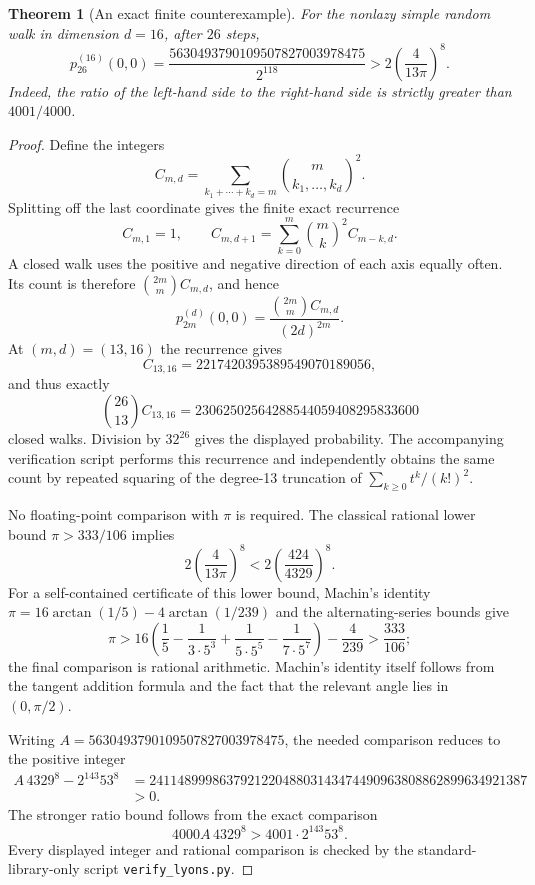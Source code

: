 \documentclass[11pt,letterpaper]{article}
\newtheorem{theorem}{Theorem}[section]
\theoremstyle{remark}\newtheorem{remark}[theorem]{Remark}
\begin{document}
\begin{theorem}[An exact finite counterexample]
\label{lcw:ulb:thm:lyons-counterexample}
For the nonlazy simple random walk in dimension $d=16$, after $26$
steps,
\[
 p_{26}^{(16)}(0,0)
 =\frac{5630493790109507827003978475}{2^{118}}
 >2\left(\frac4{13\pi}\right)^8.
\]
Indeed, the ratio of the left-hand side to the right-hand side is
strictly greater than $4001/4000$.
\end{theorem}

\begin{proof}
Define the integers
\[
 C_{m,d}=\sum_{k_1+\cdots+k_d=m}
            \binom{m}{k_1,\ldots,k_d}^{\!2}.
\]
Splitting off the last coordinate gives the finite exact recurrence
\[
 C_{m,1}=1,\qquad
 C_{m,d+1}=\sum_{k=0}^m\binom{m}{k}^2 C_{m-k,d}.
\]
A closed walk uses the positive and negative direction of each
axis equally often. Its count is therefore
$\binom{2m}{m}C_{m,d}$, and hence
\[
 p_{2m}^{(d)}(0,0)
 =\frac{\binom{2m}{m}C_{m,d}}{(2d)^{2m}}.
\]
At $(m,d)=(13,16)$ the recurrence gives
\[
 C_{13,16}=2217420395389549070189056,
\]
and thus exactly
\[
 \binom{26}{13}C_{13,16}
   =23062502564288544059408295833600
\]
closed walks. Division by $32^{26}$ gives the displayed probability.
The accompanying verification script performs this recurrence and
independently obtains the same count by repeated squaring of the
degree-13 truncation of $\sum_{k\ge0}t^k/(k!)^2$.

No floating-point comparison with $\pi$ is required. The classical
rational lower bound $\pi>333/106$ implies
\[
 2\left(\frac4{13\pi}\right)^8
   <2\left(\frac{424}{4329}\right)^8.
\]
For a self-contained certificate of this lower bound, Machin's identity
$\pi=16\arctan(1/5)-4\arctan(1/239)$ and the alternating-series
bounds give
\[
 \pi>
 16\left(\frac15-\frac1{3\cdot5^3}
                 +\frac1{5\cdot5^5}-\frac1{7\cdot5^7}\right)
       -\frac4{239}
 >\frac{333}{106};
\]
the final comparison is rational arithmetic. Machin's identity itself
follows from the tangent addition formula and the fact that the
relevant angle lies in $(0,\pi/2)$.

Writing $A=5630493790109507827003978475$, the needed comparison reduces
to the positive integer
\begin{align*}
 A\,4329^8-2^{143}53^8
 &=241148999863792122048803143474490963808862899634921387\\
 &>0.
\end{align*}
The stronger ratio bound follows from the exact comparison
\[
 4000 A\,4329^8>4001\cdot2^{143}53^8.
\]
Every displayed integer and rational comparison is checked by the
standard-library-only script \texttt{verify\_lyons.py}.
\end{proof}
\end{document}

